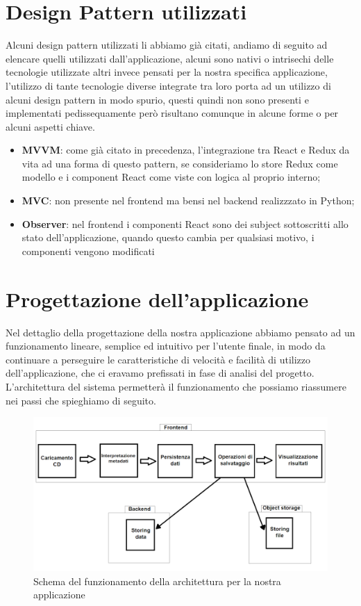 \section{Design Pattern utilizzati}
Alcuni design pattern utilizzati li abbiamo già citati, andiamo di seguito ad elencare quelli utilizzati dall'applicazione, alcuni sono nativi o intrisechi delle tecnologie utilizzate
altri invece pensati per la nostra specifica applicazione, l'utilizzo di tante tecnologie diverse integrate tra loro porta ad un utilizzo di alcuni design pattern in modo spurio,
questi quindi non sono presenti e implementati pedissequamente però risultano comunque in alcune forme o per alcuni aspetti chiave.
\begin{itemize}
  \item \textbf{MVVM}: come già citato in precedenza, l'integrazione tra React e Redux da vita ad una forma di questo pattern, se consideriamo lo store Redux come modello e i
        component React come viste con logica al proprio interno;
  \item \textbf{MVC}: non presente nel frontend ma bensi nel backend realizzzato in Python;
  \item \textbf{Observer}: nel frontend i componenti React sono dei subject sottoscritti allo stato dell'applicazione, quando questo cambia per qualsiasi motivo, i componenti
        vengono modificati
\end{itemize}

\newpage
\section{Progettazione dell'applicazione}
Nel dettaglio della progettazione della nostra applicazione abbiamo pensato ad un funzionamento lineare, semplice ed intuitivo per l'utente finale, in modo da continuare a
perseguire le caratteristiche di velocità e facilità di utilizzo dell'applicazione, che ci eravamo prefissati in fase di analisi del progetto. L'architettura del sistema
permetterà il funzionamento che possiamo riassumere nei passi che spieghiamo di seguito.
\begin{figure}[H]
  \centering
  \includegraphics[width=\textwidth]{immagini/funzionamento.png}
  \caption{Schema del funzionamento della architettura per la nostra applicazione}
\end{figure}

